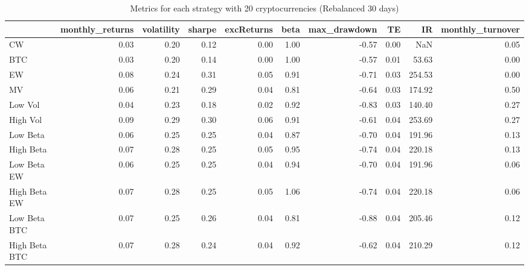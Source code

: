 \begin{table}
\centering
\caption{Metrics for each strategy with 20 cryptocurrencies (Rebalanced 30 days)}
\label{metrics20_30}
\begin{tabular}{lrrrrrrrrr}
\toprule
{} &  monthly\_returns &  volatility &  sharpe &  excReturns &  beta &  max\_drawdown &   TE &     IR &  monthly\_turnover \\
\midrule
CW            &             0.03 &        0.20 &    0.12 &        0.00 &  1.00 &         -0.57 & 0.00 &    NaN &              0.05 \\
BTC           &             0.03 &        0.20 &    0.14 &        0.00 &  1.00 &         -0.57 & 0.01 &  53.63 &              0.00 \\
EW            &             0.08 &        0.24 &    0.31 &        0.05 &  0.91 &         -0.71 & 0.03 & 254.53 &              0.00 \\
MV            &             0.06 &        0.21 &    0.29 &        0.04 &  0.81 &         -0.64 & 0.03 & 174.92 &              0.50 \\
Low Vol       &             0.04 &        0.23 &    0.18 &        0.02 &  0.92 &         -0.83 & 0.03 & 140.40 &              0.27 \\
High Vol      &             0.09 &        0.29 &    0.30 &        0.06 &  0.91 &         -0.61 & 0.04 & 253.69 &              0.27 \\
Low Beta      &             0.06 &        0.25 &    0.25 &        0.04 &  0.87 &         -0.70 & 0.04 & 191.96 &              0.13 \\
High Beta     &             0.07 &        0.28 &    0.25 &        0.05 &  0.95 &         -0.74 & 0.04 & 220.18 &              0.13 \\
Low Beta EW   &             0.06 &        0.25 &    0.25 &        0.04 &  0.94 &         -0.70 & 0.04 & 191.96 &              0.06 \\
High Beta EW  &             0.07 &        0.28 &    0.25 &        0.05 &  1.06 &         -0.74 & 0.04 & 220.18 &              0.06 \\
Low Beta BTC  &             0.07 &        0.25 &    0.26 &        0.04 &  0.81 &         -0.88 & 0.04 & 205.46 &              0.12 \\
High Beta BTC &             0.07 &        0.28 &    0.24 &        0.04 &  0.92 &         -0.62 & 0.04 & 210.29 &              0.12 \\
\bottomrule
\end{tabular}
\end{table}
